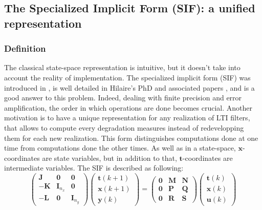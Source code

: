 	\subsection{The Specialized Implicit Form (SIF): a unified representation}
	\subsubsection{Definition}
	The classical state-space representation is intuitive, but it doesn't take into account the reality of implementation.
	The specialized implicit form (SIF) was introduced in \cite{sifd}, is well detailed in Hilaire's PhD and associated papers \cite{hilaire,sif},
	and is a good answer to this problem.
	Indeed, dealing with finite precision and error amplification, the order in which operations are done becomes crucial.
	Another motivation is to have a unique representation for any realization of LTI filters,
	that allows to compute every degradation measures instead of redevelopping them for each new realization.
	This form distinguishes computations done at one time from computations done the other times. As well as
	in a state-space, $\boldsymbol{x}$-coordinates are state variables, but in addition to that, $\boldsymbol{t}$-coordinates are intermediate variables.
	The SIF is described as following:
	\begin{equation} \label{sifdef}
		\begin{pmatrix}
			\boldsymbol{J} & \boldsymbol{0} & \boldsymbol{0} \\
			\boldsymbol{-K} & \boldsymbol{I}_{n_x} & \boldsymbol{0} \\
			\boldsymbol{-L} & \boldsymbol{0} & \boldsymbol{I}_{n_y} 
		\end{pmatrix}
		\begin{pmatrix}
			\boldsymbol{t} (k+1)  \\
			\boldsymbol{x} (k+1)  \\
			\boldsymbol{y} (k) 
		\end{pmatrix}
		=
		\begin{pmatrix}
			\boldsymbol{0} & \boldsymbol{M} & \boldsymbol{N} \\
			\boldsymbol{0} & \boldsymbol{P} & \boldsymbol{Q} \\
			\boldsymbol{0} & \boldsymbol{R} & \boldsymbol{S} 
		\end{pmatrix}
		\begin{pmatrix}
			\boldsymbol{t} (k)  \\
			\boldsymbol{x} (k)  \\
			\boldsymbol{u} (k) 
		\end{pmatrix}
	\end{equation}
